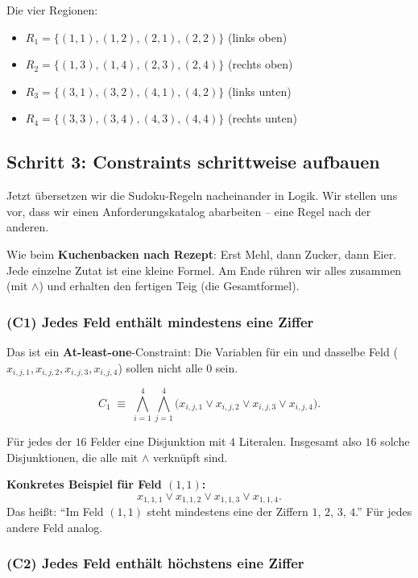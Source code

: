 \documentclass[a4paper,12pt]{article}
\begin{document}
Die vier Regionen:
\begin{itemize}[nosep]
\item $R_1 = \{(1,1), (1,2), (2,1), (2,2)\}$ \quad (links oben)
\item $R_2 = \{(1,3), (1,4), (2,3), (2,4)\}$ \quad (rechts oben)
\item $R_3 = \{(3,1), (3,2), (4,1), (4,2)\}$ \quad (links unten)
\item $R_4 = \{(3,3), (3,4), (4,3), (4,4)\}$ \quad (rechts unten)
\end{itemize}

\subsection*{Schritt 3: Constraints schrittweise aufbauen}

Jetzt \"ubersetzen wir die Sudoku-Regeln nacheinander in Logik. Wir
stellen uns vor, dass wir einen Anforderungskatalog abarbeiten --
eine Regel nach der anderen.

\begin{analogie}
Wie beim \textbf{Kuchenbacken nach Rezept}: Erst Mehl, dann Zucker,
dann Eier. Jede einzelne Zutat ist eine kleine Formel. Am Ende
r\"uhren wir alles zusammen (mit $\wedge$) und erhalten den fertigen
Teig (die Gesamtformel).
\end{analogie}

\subsubsection*{(C1) Jedes Feld enth\"alt mindestens eine Ziffer}

Das ist ein \textbf{At-least-one}-Constraint: Die Variablen f\"ur ein
und dasselbe Feld ($x_{i,j,1}, x_{i,j,2}, x_{i,j,3}, x_{i,j,4}$)
sollen nicht alle $0$ sein.

\[
C_1 \;\equiv\;
\bigwedge_{i=1}^{4} \bigwedge_{j=1}^{4}
\bigl(x_{i,j,1} \vee x_{i,j,2} \vee x_{i,j,3} \vee x_{i,j,4}\bigr).
\]

F\"ur jedes der $16$ Felder eine Disjunktion mit $4$ Literalen.
Insgesamt also $16$ solche Disjunktionen, die alle mit $\wedge$
verkn\"upft sind.

\textbf{Konkretes Beispiel f\"ur Feld $(1,1)$:}
\[
x_{1,1,1} \vee x_{1,1,2} \vee x_{1,1,3} \vee x_{1,1,4}.
\]
Das hei{\ss}t: "`Im Feld $(1,1)$ steht mindestens eine der Ziffern
$1$, $2$, $3$, $4$."' F\"ur jedes andere Feld analog.

\subsubsection*{(C2) Jedes Feld enth\"alt h\"ochstens eine Ziffer}
\end{document}
